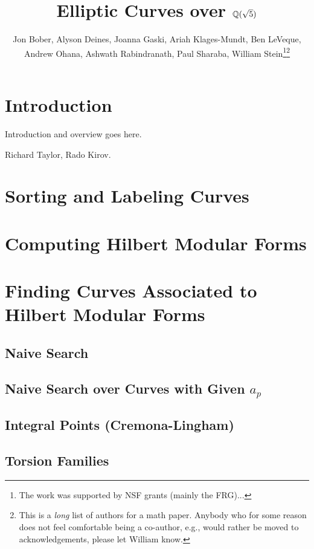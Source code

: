 \documentclass{article}
\title{Elliptic Curves over $\mathbb{Q}(\sqrt{5})$}
\author{Jon Bober, Alyson Deines, Joanna Gaski, Ariah Klages-Mundt,
Ben LeVeque,\\Andrew Ohana, Ashwath Rabindranath, Paul Sharaba, 
William Stein\footnote{The work was supported by NSF 
grants (mainly the FRG)...}\footnote{This is a {\em long} list of authors for a math
paper.  Anybody who for some reason does not feel comfortable
being a co-author, e.g., would rather be moved to acknowledgements, please let William know.}}
\begin{document}
\maketitle

\begin{abstract} 
\end{abstract}

\tableofcontents

\section{Introduction}\label{sec:intro}

Introduction and overview goes here.

 Richard Taylor, Rado Kirov. 

\section{Sorting and Labeling Curves}\label{sec:sort}
    

\section{Computing Hilbert Modular Forms}\label{sec:hmf}
    

\section{Finding Curves Associated to Hilbert Modular Forms}\label{sec:finding}
 
\subsection{Naive Search}

\subsection{Naive Search over Curves with Given $a_p$}
    

\subsection{Integral Points (Cremona-Lingham)}
    

\subsection{Torsion Families}
    
\end{document}
